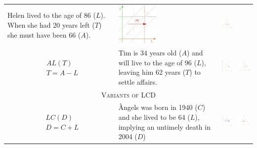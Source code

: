 \documentclass[
  12pt
]{scrartcl}
\begin{document}
\begin{center}
\begin{longtable}{m{}m{}m{}m{}}
  Helen lived to the age of 86 ($L$). When she had 20 years left ($T$) she must have been 66 ($A$). &
  \includegraphics[height = 2cm]{../fig/TLa.pdf} &
  \includegraphics[height = 2cm]{../fig/TLa_iso.pdf}  \\
  $$\begin{aligned}
    &AL(T) \\
    &T = A - L
  \end{aligned}$$ &
  Tim is 34 years old ($A$) and will live to the age of 96 ($L$), leaving him 62 years ($T$) to settle affairs. &
  \includegraphics[height = 2cm]{../fig/ALt.pdf} &
  \includegraphics[height = 2cm]{../fig/ALt_iso.pdf}  \\
  \midrule
  \multicolumn{4}{c}{\textsc{Variants of LCD}} \\
  \midrule
  $$\begin{aligned}
    &LC(D) \\
    &D = C + L
  \end{aligned}$$ &
  Àngels was born in 1940 ($C$) and she lived to be 64 ($L$), implying an
  untimely death in 2004 ($D$) &
  \includegraphics[height = 2cm]{../fig/LCd.pdf} &
  \includegraphics[height = 2cm]{../fig/LCd_iso.pdf}  \\

\end{longtable}
\end{center}
\end{document}
